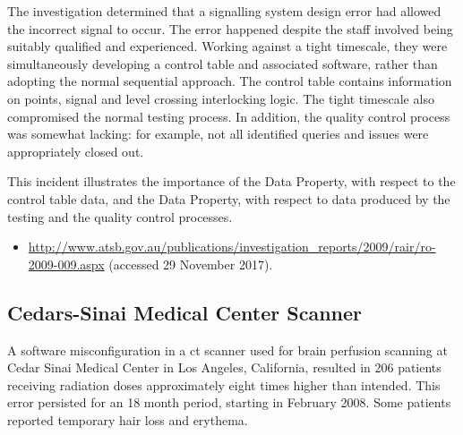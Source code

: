 The investigation determined that a signalling system design error had allowed the incorrect signal to occur. The error happened despite the staff involved being suitably qualified and experienced. Working against a tight timescale, they were simultaneously developing a control table and associated software, rather than adopting the normal sequential approach. The control table contains \gls{information} on points, signal and level crossing interlocking logic. The tight timescale also compromised the normal testing process. In addition, the quality control process was somewhat lacking: for example, not all identified queries and issues were appropriately closed out.

This incident illustrates the importance of the  Data Property, with respect to the control table data, and the  Data Property, with respect to data produced by the testing and the quality control processes.

\begin{samepage}
\begin{itemize}
	\item \raggedright{\href{http://www.atsb.gov.au/publications/investigation_reports/2009/rair/ro-2009-009.aspx}{http://www.atsb.gov.au/publications/investigation\_reports/2009/rair/ro-2009-009.aspx} (accessed 29 November 2017).}
\end{itemize}
\end{samepage}


\subsection{\protect Cedars-Sinai Medical Center\protect{} Scanner} \label{bkm:incacc:cedarssinai}
A software misconfiguration in a \gls{ct} scanner used for brain perfusion scanning at Cedar Sinai Medical Center in Los Angeles, California, resulted in 206 patients receiving radiation doses approximately eight times higher than intended. This error persisted for an 18 month period, starting in February 2008. Some patients reported temporary hair loss and erythema. 

